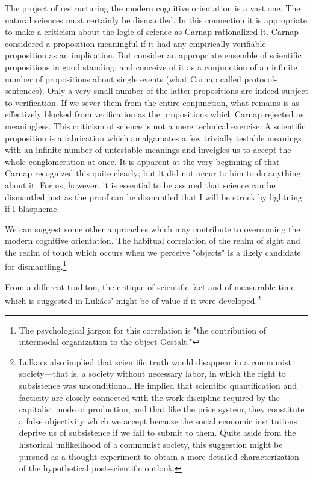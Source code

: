 \documentclass[10pt,twoside,draft]{memoir}
\begin{document}
The project of restructuring the modern cognitive orientation is a vast 
one. The natural sciences must certainly be dismantled. In this connection it 
is appropriate to make a criticism about the logic of science as Carnap 
rationalized it. Carnap considered a proposition meaningful if it had any 
empirically verifiable proposition as an implication. But consider an 
appropriate ensemble of scientific propositions in good standing, and 
conceive of it as a conjunction of an infinite number of propositions about 
single events (what Carnap called protocol-sentences). Only a very small 
number of the latter propositions are indeed subject to verification. If we 
sever them from the entire conjunction, what remains is as effectively 
blocked from verification as the propositions which Carnap rejected as 
meaningless. This criticism of science is not a mere technical exercise. A 
scientific proposition is a fabrication which amalgamates a few trivially 
testable meanings with an infinite number of untestable meanings and 
inveigles us to accept the whole conglomeration at once. It is apparent at the 
very beginning of  that Carnap recognized this 
quite clearly; but it did not occur to him to do anything about it. For us, 
however, it is essential to be assured that science can be dismantled just as 
the proof can be dismantled that I will be struck by lightning if I blaspheme. 

We can suggest some other approaches which may contribute to 
overcoming the modern cognitive orientation. The habitual correlation of 
the realm of sight and the realm of touch which occurs when we perceive 
"objects" is a likely candidate for dismantling.\footnote{The psychological jargon for 
this correlation is "the contribution of intermodal organization to the 
object Gestalt."}

From a different traditon, the critique of scientific fact and of 
measurable time which is suggested in Luk\'{a}cs'  might be of value if it were developed.\footnote{Lulkacs also implied that scientific truth would disappear in a communist 
society---that is, a society without necessary labor, in which the right to 
subsistence was unconditional. He implied that scientific quantification and 
facticity are closely connected with the work discipline required by the 
capitalist mode of production; and that like the price system, they constitute 
a false objectivity which we accept because the social economic institutions 
deprive us of subsistence if we fail to submit to them. Quite aside from the 
historical unlikelihood of a communist society, this suggestion might be 
pursued as a thought experiment to obtain a more detailed characterization 
of the hypothetical post-scientific outlook.}
\end{document}
